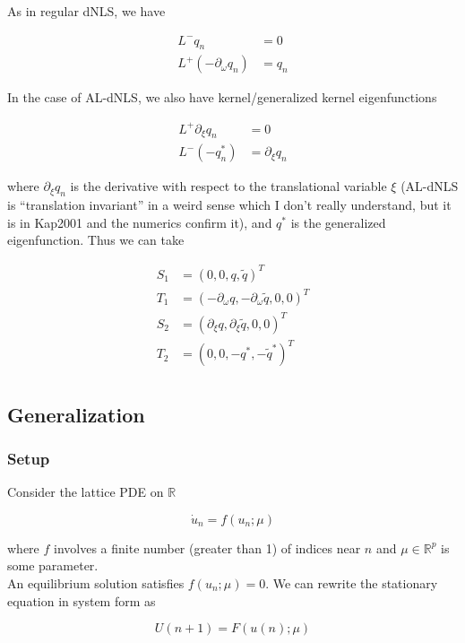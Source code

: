 \documentclass[12pt]{article}
\def\R{{\mathbb R}}
\begin{document}
As in regular dNLS, we have

\begin{align*}
L^- q_n &= 0 \\
L^+(-\partial_\omega q_n) &= q_n 
\end{align*}

In the case of AL-dNLS, we also have kernel/generalized kernel eigenfunctions

\begin{align*}
L^+ \partial_\xi q_n &= 0 \\
L^- (-q^*_n) &= \partial_\xi q_n
\end{align*}

where $\partial_\xi q_n$ is the derivative with respect to the translational variable $\xi$ (AL-dNLS is ``translation invariant'' in a weird sense which I don't really understand, but it is in Kap2001 and the numerics confirm it), and $q^*$ is the generalized eigenfunction. Thus we can take

\begin{align*}
S_1 &= (0, 0, q, \tilde{q})^T \\
T_1 &= (-\partial_\omega q, -\partial_\omega \tilde{q}, 0, 0)^T \\
S_2 &= (\partial_\xi q, \partial_\xi \tilde{q}, 0, 0)^T \\
T_2 &= (0, 0, -q^*, -\tilde{q}^*)^T \\
\end{align*}

\subsection{Generalization}

\subsubsection{Setup}

Consider the lattice PDE on $\R$

\begin{equation}\label{latticePDE}
\dot{u}_n = f(u_n; \mu)
\end{equation}

where $f$ involves a finite number (greater than 1) of indices near $n$ and $\mu \in \R^p$ is some parameter.\\

An equilibrium solution satisfies $f(u_n; \mu) = 0$. We can rewrite the stationary equation in system form as

\begin{equation}\label{diffeq}
U(n+1) = F(u(n); \mu)
\end{equation}
\end{document}
